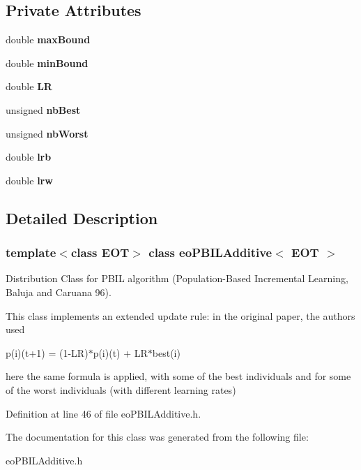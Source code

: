 \subsection*{Private Attributes}
\begin{CompactItemize}
\item 
double {\bf max\-Bound}\label{classeo_p_b_i_l_additive_r0}

\item 
double {\bf min\-Bound}\label{classeo_p_b_i_l_additive_r1}

\item 
double {\bf LR}\label{classeo_p_b_i_l_additive_r2}

\item 
unsigned {\bf nb\-Best}\label{classeo_p_b_i_l_additive_r3}

\item 
unsigned {\bf nb\-Worst}\label{classeo_p_b_i_l_additive_r4}

\item 
double {\bf lrb}\label{classeo_p_b_i_l_additive_r5}

\item 
double {\bf lrw}\label{classeo_p_b_i_l_additive_r6}

\end{CompactItemize}


\subsection{Detailed Description}
\subsubsection*{template$<$class EOT$>$ class eo\-PBILAdditive$<$ EOT $>$}

Distribution Class for PBIL algorithm (Population-Based Incremental Learning, Baluja and Caruana 96). 

This class implements an extended update rule: in the original paper, the authors used

p(i)(t+1) = (1-LR)$\ast$p(i)(t) + LR$\ast$best(i)

here the same formula is applied, with some of the best individuals and for some of the worst individuals (with different learning rates) 



Definition at line 46 of file eo\-PBILAdditive.h.

The documentation for this class was generated from the following file:\begin{CompactItemize}
\item 
eo\-PBILAdditive.h\end{CompactItemize}
